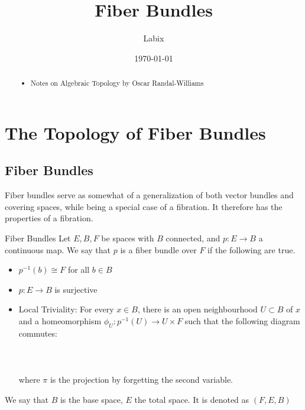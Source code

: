 \documentclass[a4paper]{article}
\title{Fiber Bundles}
\author{Labix}
\date{\today}
\begin{document}
\maketitle
\begin{abstract}
\begin{itemize}
\item Notes on Algebraic Topology by Oscar Randal-Williams
\end{itemize}
\end{abstract}
\pagebreak
\tableofcontents

\pagebreak
\section{The Topology of Fiber Bundles}
\subsection{Fiber Bundles}
Fiber bundles serve as somewhat of a generalization of both vector bundles and covering spaces, while being a special case of a fibration. It therefore has the properties of a fibration. 

\begin{defn}{Fiber Bundles}{} Let $E,B,F$ be spaces with $B$ connected, and $p:E\to B$ a continuous map. We say that $p$ is a fiber bundle over $F$ if the following are true. 
\begin{itemize}
\item $p^{-1}(b)\cong F$ for all $b\in B$
\item $p:E\to B$ is surjective
\item Local Triviality: For every $x\in B$, there is an open neighbourhood $U\subset B$ of $x$ and a homeomorphism $\phi_U:p^{-1}(U)\to U\times F$ such that the following diagram commutes: \\~\\
\\~\\
where $\pi$ is the projection by forgetting the second variable. 
\end{itemize}
We say that $B$ is the base space, $E$ the total space. It is denoted as $(F,E,B)$
\end{defn}
\end{document}
